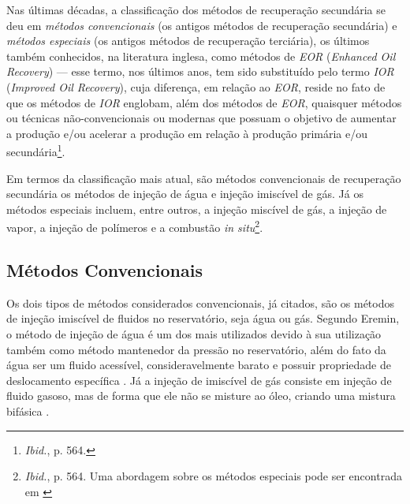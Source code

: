 Nas \'{u}ltimas d\'{e}cadas, a classifica\c{c}\~{a}o dos m\'{e}todos de recupera\c{c}\~{a}o secund\'{a}ria se deu em \textit{m\'{e}todos convencionais} (os antigos m\'{e}todos de recupera\c{c}\~{a}o secund\'{a}ria) e \textit{m\'{e}todos especiais} (os antigos m\'{e}todos de recupera\c{c}\~{a}o terci\'{a}ria), os \'{u}ltimos tamb\'{e}m conhecidos, na literatura inglesa, como m\'{e}todos de \textit{EOR} (\textit{Enhanced Oil Recovery}) --- esse termo, nos \'{u}ltimos anos, tem sido substitu\'{i}do pelo termo \textit{IOR} (\textit{Improved Oil Recovery}), cuja diferen\c{c}a, em rela\c{c}\~{a}o ao \textit{EOR}, reside no fato de que os m\'{e}todos de \textit{IOR} englobam, al\'{e}m dos m\'{e}todos de \textit{EOR}, quaisquer m\'{e}todos ou t\'{e}cnicas n\~{a}o-convencionais ou modernas que possuam o objetivo de aumentar a produ\c{c}\~{a}o e/ou acelerar a produ\c{c}\~{a}o em rela\c{c}\~{a}o \`{a} produ\c{c}\~{a}o prim\'{a}ria e/ou secund\'{a}ria\footnote{\textit{Ibid.}, p. 564.}. 

Em termos da classifica\c{c}\~{a}o mais atual, s\~{a}o m\'{e}todos convencionais de recupera\c{c}\~{a}o secund\'{a}ria os m\'{e}todos de inje\c{c}\~{a}o de \'{a}gua e inje\c{c}\~{a}o imisc\'{i}vel de g\'{a}s. J\'{a} os m\'{e}todos especiais incluem, entre outros, a inje\c{c}\~{a}o misc\'{i}vel de g\'{a}s, a inje\c{c}\~{a}o de vapor, a inje\c{c}\~{a}o de pol\'{i}meros e a combust\~{a}o \textit{in situ}\footnote{\textit{Ibid.}, p. 564. Uma abordagem sobre os m\'{e}todos especiais pode ser encontrada em \cite[pp. 677-726]{engres}}.

\subsection{M\'{e}todos Convencionais}
Os dois tipos de m\'{e}todos considerados convencionais, j\'{a} citados, s\~{a}o os m\'{e}todos de inje\c{c}\~{a}o imisc\'{i}vel de fluidos no reservat\'{o}rio, seja \'{a}gua ou g\'{a}s. Segundo Eremin, o m\'{e}todo de inje\c{c}\~{a}o de \'{a}gua \'{e} um dos mais utilizados devido \`{a} sua utiliza\c{c}\~{a}o tamb\'{e}m como m\'{e}todo mantenedor da press\~{a}o no reservat\'{o}rio, al\'{e}m do fato da \'{a}gua ser um fluido acess\'{i}vel, consideravelmente barato e possuir propriedade de deslocamento espec\'{i}fica \cite{eremin}. J\'{a} a inje\c{c}\~{a}o de imisc\'{i}vel de g\'{a}s consiste em inje\c{c}\~{a}o de fluido gasoso, mas de forma que ele n\~{a}o se misture ao \'{o}leo, criando uma mistura bif\'{a}sica \cite[p. 564]{engres}.

